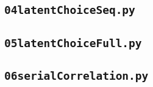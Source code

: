 \documentclass[12pt,a4paper]{article}
\begin{document}
\subsection{\lstinline$04latentChoiceSeq.py$}
\label{sec:04latentChoiceSeq}


\subsection{\lstinline$05latentChoiceFull.py$}
\label{sec:05latentChoiceFull}


\subsection{\lstinline$06serialCorrelation.py$}
\label{sec:06serialCorrelation}



\clearpage


\end{document}
